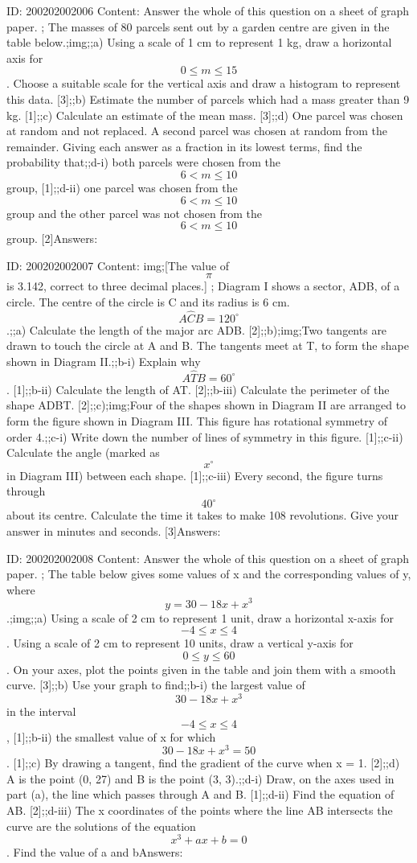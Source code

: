 \documentclass{article}
\begin{document}
ID: 200202002006
Content:
Answer the whole of this question on a sheet of graph paper. ; The masses of 80 parcels sent out by a garden centre are given in the table below.;img;;a) Using a scale of 1 cm to represent 1 kg, draw a horizontal axis for $$0\leq m\leq 15$$. Choose a suitable scale for the vertical axis and draw a histogram to represent this data. [3];;b) Estimate the number of parcels which had a mass greater than 9 kg. [1];;c) Calculate an estimate of the mean mass. [3];;d) One parcel was chosen at random and not replaced. A second parcel was chosen at random from the remainder. Giving each answer as a fraction in its lowest terms, find the probability that;;d-i) both parcels were chosen from the $$6<m\leq 10$$ group, [1];;d-ii) one parcel was chosen from the $$6<m\leq10$$ group and the other parcel was not chosen from the $$6<m\leq10$$ group. [2]Answers:

ID: 200202002007
Content:
img;[The value of $$\pi$$ is 3.142, correct to three decimal places.] ; Diagram I shows a sector, ADB, of a circle. The centre of the circle is C and its radius is 6 cm. $$A \hat CB=120^{\circ}$$.;;a) Calculate the length of the major arc ADB. [2];;b);img;Two tangents are drawn to touch the circle at A and B. The tangents meet at T, to form the shape shown in Diagram II.;;b-i) Explain why $$A \hat TB=60^{\circ}$$. [1];;b-ii) Calculate the length of AT. [2];;b-iii) Calculate the perimeter of the shape ADBT. [2];;c);img;Four of the shapes shown in Diagram II are arranged to form the figure shown in Diagram III. This figure has rotational symmetry of order 4.;;c-i) Write down the number of lines of symmetry in this figure. [1];;c-ii) Calculate the angle (marked as $$x^{\circ}$$ in Diagram III) between each shape. [1];;c-iii) Every second, the figure turns through $$40^{\circ}$$ about its centre. Calculate the time it takes to make 108 revolutions. Give your answer in minutes and seconds. [3]Answers:

ID: 200202002008
Content:
Answer the whole of this question on a sheet of graph paper. ; The table below gives some values of x and the corresponding values of y, where $$y=30-18x+x^{3} $$.;img;;a) Using a scale of 2 cm to represent 1 unit, draw a horizontal x-axis for $$-4\leq x\leq4$$. Using a scale of 2 cm to represent 10 units, draw a vertical y-axis for $$0\leq y\leq 60$$. On your axes, plot the points given in the table and join them with a smooth curve. [3];;b) Use your graph to find;;b-i) the largest value of  $$30-18x+x^{3}$$ in the interval $$-4\leq x\leq 4$$, [1];;b-ii) the smallest value of x for which $$30-18x+x^{3} =50$$. [1];;c) By drawing a tangent, find the gradient of the curve when x = 1. [2];;d) A is the point (0, 27) and B is the point (3, 3).;;d-i) Draw, on the axes used in part (a), the line which passes through A and B. [1];;d-ii) Find the equation of AB. [2];;d-iii) The x coordinates of the points where the line AB intersects the curve are the solutions of the equation $$x^{3} +ax+b=0$$. Find the value of a and bAnswers:
\end{document}

